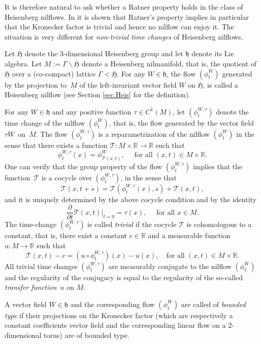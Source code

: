 \documentclass[10pt]{amsart}
\let\mathcal\mathscr
\theoremstyle{definition}
\theoremstyle{plain}
\newcommand\RR{\mathbb{R}}
\begin{document}
It is therefore natural to ask whether a Ratner property holds in the class of Heisenberg nilflows. In \cite{KL} it is shown that Ratner's property implies in particular that the Kronecker factor is trivial and hence no nilflow can enjoy it. The situation is very different for \emph{non-trivial time changes} of Heisenberg nilflows.

Let $\mathfrak H$ denote the $3$-dimensional Heisenberg group and let $\mathfrak h$ denote its Lie algebra. Let $M:= \Gamma \backslash \mathfrak H$ denote a Heisenberg
nilmanifold, that is, the quotient of $\mathfrak H$ over a (\hbox{co-compact}) lattice $\Gamma <\mathfrak H$. For any $W\in \mathfrak h$, the flow $(\phi_t^{W})$ generated by the projection to~$M$ of the left-invariant vector field $W$ on $\mathfrak H$, is called a Heisenberg nilflow (see Section \ref{sec.Heis} for the definition).

For any $W\in \mathfrak h$ and any positive function $\tau\in C^1(M)$, let $(\phi_t^{W,\tau})$ denote the time change of the nilflow $(\phi_t^{W})$, that is, the flow generated by the vector field $\tau W$~on~$M$. The
flow $(\phi_t^{W,\tau})$ is a reparametrization of the nilflow $(\phi_t^{W})$ in the sense that there exists a
function $\mathcal T : M \times \RR \to \RR$ such that
\[
\phi_t^{W,\tau} (x) = \phi_{\mathcal T(x,t)} ^{W}, \quad \text{ for all } (x,t) \in M\times \RR.
\]
One can verify that the group property of the flow $(\phi_t^{W,\tau})$ implies that the function~$\mathcal T$ is a cocycle over $(\phi_t^{W,\tau})$, in the sense that
\[
\mathcal T(x,t+s) = \mathcal T (\phi_t^{W,\tau}(x),s) + \mathcal T (x,t),
\]
and it is uniquely determined by the above cocycle condition and by the identity
\[
\frac{\partial}{\partial t} {\mathcal T}(x, t) \vert _{t=0} = \tau (x), \quad \text{ for all }x\in M.
\]
The time-change $(\phi_t^{W,\tau})$ is called \emph{trivial} if the cocycle $\mathcal T$ is cohomologous to a constant, that is, there exist a constant $c\in \RR$ and a measurable function $u:M\to \RR$ such that
\[\mathcal T(x,t) -c = (u\circ \phi_t^{W,\tau})(x) - u(x), \quad \text{for all } (x,t) \in M\times \RR.\]
All trivial time changes $(\phi_t^{W,\tau})$ are measurably conjugate to the nilflow $(\phi_t^{W})$ and
the regularity of the conjugacy is equal to the regularity of the so-called \emph{transfer function}~$u$ on $M$.

A vector field $W\in \mathfrak h$ and the corresponding flow $(\phi_t^{W})$ are called of \emph{bounded type} if their projections on the Kronecker factor (which are respectively
a constant coefficients vector field and the corresponding linear flow on a $2$-dimensional torus) are of bounded type.
\end{document}
